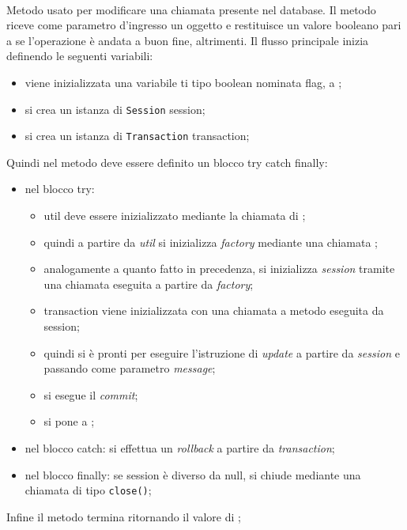 \begin{description}
	\item{}\\
	Metodo usato per modificare una chiamata presente nel database. Il metodo riceve come parametro d'ingresso un oggetto  e restituisce un valore booleano  pari a  se l'operazione è andata a buon fine,  altrimenti. Il flusso principale inizia definendo le seguenti variabili:
	\begin{itemize}
		\item viene inizializzata una variabile ti tipo boolean nominata flag, a ;
		\item si crea un istanza di \texttt{Session} session;
		\item si crea un istanza di \texttt{Transaction} transaction;
	\end{itemize}
	Quindi nel metodo deve essere definito un blocco try catch finally:
	\begin{itemize}
		\item nel blocco try:
		\begin{itemize}
			\item util deve essere inizializzato mediante la chiamata  di ;
			\item quindi a partire da \textit{util} si inizializza \textit{factory} mediante una chiamata ;
			\item analogamente a quanto fatto in precedenza, si inizializza \textit{session} tramite una chiamata  eseguita a partire da \textit{factory};
			\item transaction viene inizializzata con una chiamata a metodo  eseguita da session;
			\item quindi si è pronti per eseguire l'istruzione di \textit{update} a partire da \textit{session} e passando come parametro \textit{message};
			\item si esegue il \textit{commit};
			\item si pone  a ;
		\end{itemize}
		\item nel blocco catch: si effettua un \textit{rollback} a partire da \textit{transaction};
		\item nel blocco finally: se session è diverso da null, si chiude mediante una chiamata di tipo \texttt{close()};
	\end{itemize}
	Infine il metodo termina ritornando il valore di ;	
	

\end{description}
